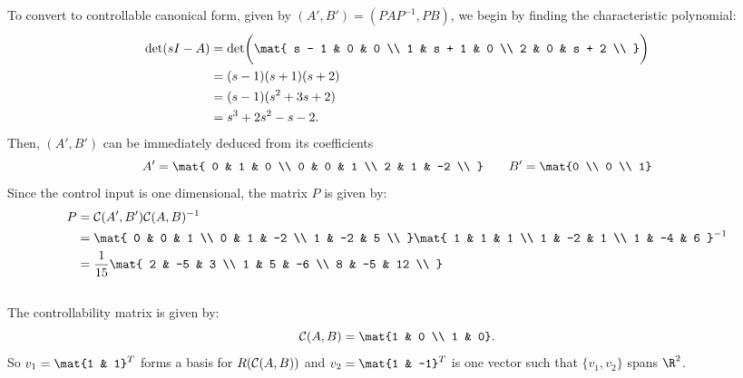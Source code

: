 \documentclass{homework}
\begin{document}
To convert to controllable canonical form, given by
$(A', B') = (PAP^{-1}, PB)$, we begin by finding the characteristic polynomial:
\begin{align*}
    \detr(sI - A) &= \detr \biggl(
        \mat{
            s - 1 & 0 & 0 \\
            1 & s + 1 & 0 \\
            2 & 0 & s + 2 \\
        }
    \biggr) \\ 
    &= (s - 1)(s + 1)(s + 2) \\
    &= (s - 1)(s^2 + 3s + 2) \\
    &= s^3 + 2s^2 - s - 2.
\end{align*}
Then, $(A', B')$ can be immediately deduced from its coefficients
\begin{equation*}
    A' = \mat{
        0 & 1 & 0 \\
        0 & 0 & 1 \\
        2 & 1 & -2 \\
    } \qquad B' = \mat{0 \\ 0 \\ 1}
\end{equation*}
Since the control input is one dimensional, the matrix $P$
is given by:
\begin{align*}
    P &= \contr(A', B') \contr(A, B)^{-1} \\
        &= \mat{
            0 & 0 & 1 \\
            0 & 1 & -2 \\
            1 & -2 & 5 \\
        } \mat{
            1 & 1 & 1 \\
            1 & -2 & 1 \\
            1 & -4 & 6
        }^{-1} \\
        &= \frac{1}{15} \mat{
            2 & -5 & 3 \\
            1 & 5 & -6 \\
            8 & -5 & 12 \\
        }
\end{align*} 

\subsection{}

The controllability matrix is given by:
\begin{equation*}
    \contr(A, B) = \mat{1 & 0 \\ 1 & 0}.
\end{equation*}
So $v_1 = \mat{1 & 1}^T$ forms a basis for $R(\mathcal{C}(A, B))$  and $v_2 = \mat{1 & -1}^T$ is one vector such that
$\{v_1, v_2\}$ spans $\R^2$.
\end{document}
